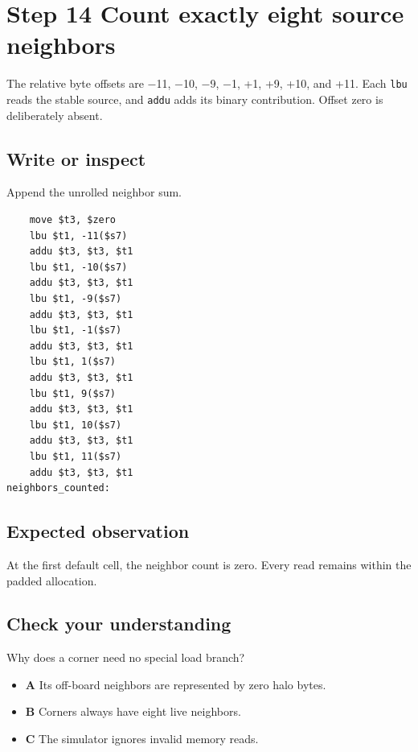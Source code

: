 \section{Step 14 Count exactly eight source
  neighbors}\label{008-life-generations-s14-step-14-count-exactly-eight-source-neighbors}

The relative byte offsets are \ensuremath{-}11, \ensuremath{-}10, \ensuremath{-}9, \ensuremath{-}1, +1, +9, +10, and +11.
Each \texttt{lbu} reads the stable source, and \texttt{addu} adds its
binary contribution. Offset zero is deliberately absent.

\subsection{Write or
  inspect}\label{008-life-generations-s14-write-or-inspect}

Append the unrolled neighbor sum.

\begin{verbatim}
    move $t3, $zero
    lbu $t1, -11($s7)
    addu $t3, $t3, $t1
    lbu $t1, -10($s7)
    addu $t3, $t3, $t1
    lbu $t1, -9($s7)
    addu $t3, $t3, $t1
    lbu $t1, -1($s7)
    addu $t3, $t3, $t1
    lbu $t1, 1($s7)
    addu $t3, $t3, $t1
    lbu $t1, 9($s7)
    addu $t3, $t3, $t1
    lbu $t1, 10($s7)
    addu $t3, $t3, $t1
    lbu $t1, 11($s7)
    addu $t3, $t3, $t1
neighbors_counted:
\end{verbatim}

\subsection{Expected
  observation}\label{008-life-generations-s14-expected-observation}

At the first default cell, the neighbor count is zero. Every read
remains within the padded allocation.

\subsection{Check your
  understanding}\label{008-life-generations-s14-check-your-understanding}

Why does a corner need no special load branch?

\begin{itemize}
  \tightlist
  \item
        \textbf{A} Its off-board neighbors are represented by zero halo bytes.
  \item
        \textbf{B} Corners always have eight live neighbors.
  \item
        \textbf{C} The simulator ignores invalid memory reads.
\end{itemize}
